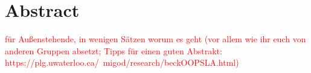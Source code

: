 \section{Abstract} \textcolor{red}{für Außenstehende, in wenigen Sätzen worum es geht (vor allem wie ihr euch von anderen Gruppen absetzt; Tipps für einen guten Abstrakt: https://plg.uwaterloo.ca/~migod/research/beckOOPSLA.html)}
